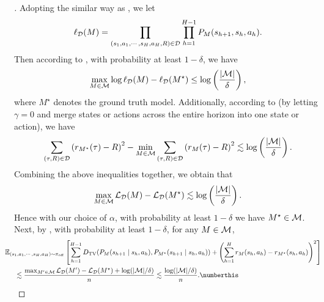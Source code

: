 \documentclass{article}
\begin{document}
\begin{proof}[]
    Adopting the similar way as \citet{xie2022armor}, we let
    $$\ell_{\mathcal{D}}(M) = \prod_{(s_1, a_1, \cdots, s_H, a_H, R)\in \mathcal{D}} \prod_{h=1}^{H-1} P_M(s_{h+1}, s_h, a_h).$$
    Then according to \citet[Lemma 8]{xie2022armor}, with probability at least $1 - \delta$, we have 
    $$\max_{M\in \mathcal{M}} \log \ell_{\mathcal{D}}(M) - \ell_{\mathcal{D}}(M^\star)\le \log\left(\frac{|\mathcal{M}|}{\delta}\right),$$
    where $M^\star$ denotes the ground truth model. Additionally, according to \citet[Theorem A.1]{xie2021bellman} (by letting $\gamma = 0$ and merge states or actions across the entire horizon into one state or action), we have 
    $$\sum_{(\tau, R)\in \mathcal{D}}\left(r_{M^\star}(\tau) - R\right)^2 - \min_{M\in \mathcal{M}}\sum_{(\tau, R)\in \mathcal{D}}\left(r_M(\tau) - R\right)^2\lesssim \log\left(\frac{|\mathcal{M}|}{\delta}\right).$$
    Combining the above inequalities together, we obtain that 
    $$\max_{M\in \mathcal{M}}\mathcal{L}_{\mathcal{D}}(M) - \mathcal{L}_{\mathcal{D}}(M^\star)\lesssim \log\left(\frac{|\mathcal{M}|}{\delta}\right).$$
    Hence with our choice of $\alpha$, with probability at least $1 - \delta$ we have $M^\star\in \mathcal{M}$. Next, by \citet[Lemma 7]{xie2022armor}, with probability at least $1 - \delta$, for any $M\in \mathcal{M}$,
    \begin{align*}
        &\hspace{-0.5cm} \EE_{(s_1, a_1, \cdots, s_H, a_H)\sim \pioff} \left[\sum_{h=1}^{H-1} \TV(P_M(s_{h+1}\mid s_h, a_h), P_{M^\star}(s_{h+1}\mid s_h, a_h)) + \left(\sum_{h=1}^H r_M(s_h, a_h) - r_{M^\star}(s_h, a_h)\right)^2\right]\\
        & \lesssim \frac{\max_{M'\in \calM} \calL_{\calD}(M') - \calL_\calD(M^\star) + \log(|\calM|/\delta)}{n}\lesssim \frac{\log(|\calM|/\delta)}{n}. \numberthis\label{eq: armor-analysis}
    \end{align*}


\end{proof}
\end{document}

